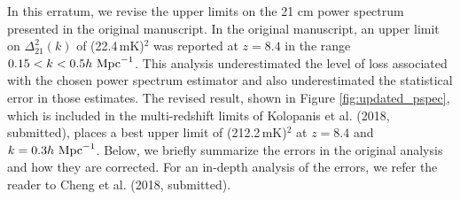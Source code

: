 \documentclass[onecolumn]{emulateapj} \shorttitle{}
\newcommand{\hMpci}{h\ {\rm Mpc}^{-1}}
\newcommand{\mKlimit}{(22.4\,\textrm{mK})$^2$ }
\newcommand{\kolopaniscitet}{Kolopanis et al. (2018, submitted)}
\newcommand{\chengcitet}{Cheng et al. (2018, submitted)}
\begin{document}
\maketitle

In this erratum, we revise the upper limits on the 21 cm power spectrum presented
in the original manuscript.  In the original manuscript, an upper limit on 
$\Delta_{21}^2(k)$ of \mKlimit was reported at $z=8.4$ in the range $0.15<k<0.5\hMpci$.
This analysis underestimated 
the level of loss associated with the chosen power spectrum estimator and also underestimated 
the statistical error in those estimates.  The revised result, shown in Figure \ref{fig:updated_pspec}, 
which is included in
the multi-redshift limits of \kolopaniscitet, places a best upper limit of (212.2\,\textrm{mK})$^2$ at $z=8.4$ and $k=0.3\hMpci$.
Below, we briefly summarize the errors in the original analysis and how they are corrected.
For an in-depth analysis of the errors, we refer the reader to \chengcitet.
\end{document}
